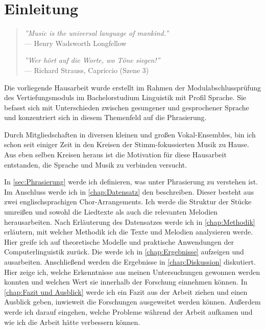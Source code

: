 \chapter{Einleitung}
\label{chap:Einleitung}


\begin{quote}
\textit{''Music is the universal language of mankind.''}
\\--- Henry Wadsworth Longfellow

\textit{''Wer hört auf die Worte, wo Töne siegen!''} 
\\--- Richard Strauss, Capriccio (Szene 3)
\end{quote}

\vspace{1cm}

Die vorliegende Hausarbeit wurde erstellt im Rahmen der Modulabschlussprüfung des Vertiefungsmoduls im Bachelorstudium Linguistik mit Profil Sprache. Sie befasst sich mit Unterschieden zwischen gesungener und gesprochener Sprache und konzentriert sich in diesem Themenfeld auf die Phrasierung.

Durch Mitgliedschaften in diversen kleinen und großen Vokal-Ensembles, bin ich schon seit einiger Zeit in den Kreisen der Stimm-fokussierten Musik zu Hause. Aus eben selben Kreisen heraus ist die Motivation für diese Hausarbeit entstanden, die Sprache und Musik zu verbinden versucht.

In \autoref{sec:Phrasierung} werde ich definieren, was unter Phrasierung zu verstehen ist.
Im Anschluss werde ich in \autoref{chap:Datensatz} den  beschreiben. Dieser besteht aus zwei englischsprachigen Chor-Arrangements. Ich werde die Struktur der Stücke umreißen und sowohl die Liedtexte als auch die relevanten Melodien herausarbeiten.
Nach Erläuterung des Datensatzes werde ich in \autoref{chap:Methodik} erläutern, mit welcher Methodik ich die Texte und Melodien analysieren werde. Hier greife ich auf theoretische Modelle und praktische Anwendungen der Computerlinguistik zurück.
Die  werde ich in \autoref{chap:Ergebnisse} aufzeigen und ausarbeiten.
Anschließend werden die Ergebnisse in \autoref{chap:Diskussion} diskutiert. Hier zeige ich, welche Erkenntnisse aus meinen Untersuchungen gewonnen werden konnten und welchen Wert sie innerhalb der Forschung einnehmen können.
In \autoref{chap:Fazit und Ausblick} werde ich ein Fazit aus der Arbeit ziehen und einen Ausblick geben, inwieweit die Forschungen ausgeweitet werden können. Außerdem werde ich darauf eingehen, welche Probleme während der Arbeit aufkamen und wie ich die Arbeit hätte verbessern können.

